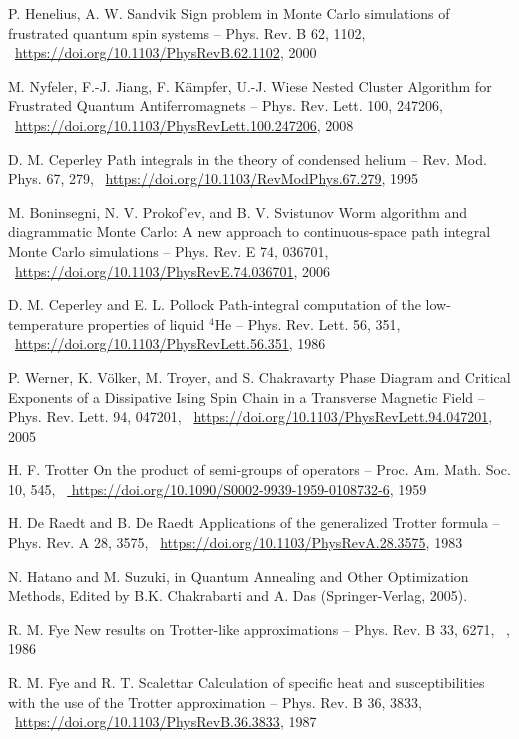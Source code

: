 \documentclass[11pt]{article}
\begin{document}
\begin{thebibliography}{3}
P. Henelius, A. W. Sandvik Sign problem in Monte Carlo simulations of frustrated quantum spin systems -- Phys. Rev. B 62, 1102, ~\url{https://doi.org/10.1103/PhysRevB.62.1102},  2000

M. Nyfeler, F.-J. Jiang, F. Kämpfer, U.-J. Wiese Nested Cluster Algorithm for Frustrated Quantum Antiferromagnets -- Phys. Rev. Lett. 100, 247206,  ~\url{https://doi.org/10.1103/PhysRevLett.100.247206}, 2008

D. M. Ceperley Path integrals in the theory of condensed helium -- Rev. Mod. Phys. 67, 279, ~\url{https://doi.org/10.1103/RevModPhys.67.279}, 1995

M. Boninsegni, N. V. Prokof’ev, and B. V. Svistunov Worm algorithm and diagrammatic Monte Carlo: A new approach to continuous-space path integral Monte Carlo simulations -- Phys. Rev. E 74, 036701,  ~\url{https://doi.org/10.1103/PhysRevE.74.036701}, 2006

D. M. Ceperley and E. L. Pollock Path-integral computation of the low-temperature properties of liquid $^4$He -- Phys. Rev. Lett. 56, 351,  ~\url{https://doi.org/10.1103/PhysRevLett.56.351}, 1986

P. Werner, K. Völker, M. Troyer, and S. Chakravarty Phase Diagram and Critical Exponents of a Dissipative Ising Spin Chain in a Transverse Magnetic Field -- Phys. Rev. Lett. 94, 047201,  ~\url{https://doi.org/10.1103/PhysRevLett.94.047201}, 2005

H. F. Trotter On the product of semi-groups of operators -- Proc. Am. Math. Soc. 10, 545,  ~\url{ https://doi.org/10.1090/S0002-9939-1959-0108732-6}, 1959

H. De Raedt and B. De Raedt Applications of the generalized Trotter formula -- Phys. Rev. A 28, 3575,  ~\url{https://doi.org/10.1103/PhysRevA.28.3575}, 1983

N. Hatano and M. Suzuki, in Quantum Annealing and Other Optimization Methods, Edited by B.K. Chakrabarti and A. Das (Springer-Verlag, 2005).

 R. M. Fye New results on Trotter-like approximations -- Phys. Rev. B 33, 6271,  ~\url{}, 1986

R. M. Fye and R. T. Scalettar Calculation of specific heat and susceptibilities with the use of the Trotter approximation -- Phys. Rev. B 36, 3833, ~\url{https://doi.org/10.1103/PhysRevB.36.3833}, 1987


\end{thebibliography}
\end{document}
